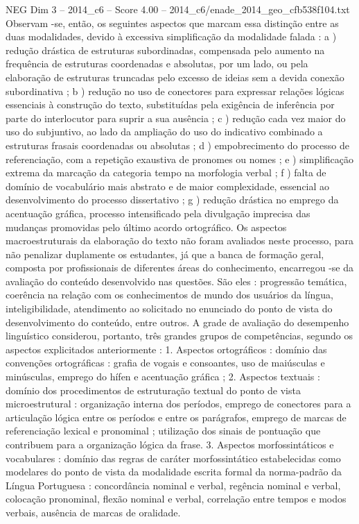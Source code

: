 \begin{textsample}{NEG Dim 3 – 2014\_c6 – Score 4.00 – 2014\_c6/enade\_2014\_geo\_cfb538f104.txt}
Observam -se, então, os seguintes aspectos que marcam essa distinção entre as duas modalidades, devido à excessiva simplificação da modalidade falada : a ) redução drástica de estruturas subordinadas, compensada pelo aumento na frequência de estruturas coordenadas e absolutas, por um lado, ou pela elaboração de estruturas truncadas pelo excesso de ideias sem a devida conexão subordinativa ; b ) redução no uso de conectores para expressar relações lógicas essenciais à construção do texto, substituídas pela exigência de inferência por parte do interlocutor para suprir a sua ausência ; c ) redução cada vez maior do uso do subjuntivo, ao lado da ampliação do uso do indicativo combinado a estruturas frasais coordenadas ou absolutas ; d ) empobrecimento do processo de referenciação, com a repetição exaustiva de pronomes ou nomes ; e ) simplificação extrema da marcação da categoria tempo na morfologia verbal ; f ) falta de domínio de vocabulário mais abstrato e de maior complexidade, essencial ao desenvolvimento do processo dissertativo ; g ) redução drástica no emprego da acentuação gráfica, processo intensificado pela divulgação imprecisa das mudanças promovidas pelo último acordo ortográfico.
Os aspectos macroestruturais da elaboração do texto não foram avaliados neste processo, para não penalizar duplamente os estudantes, já que a banca de formação geral, composta por profissionais de diferentes áreas do conhecimento, encarregou -se da avaliação do conteúdo desenvolvido nas questões.
São eles : progressão temática, coerência na relação com os conhecimentos de mundo dos usuários da língua, inteligibilidade, atendimento ao solicitado no enunciado do ponto de vista do desenvolvimento do conteúdo, entre outros.
A grade de avaliação do desempenho linguístico considerou, portanto, três grandes grupos de competências, segundo os aspectos explicitados anteriormente : 1.
Aspectos ortográficos : domínio das convenções ortográficas : grafia de vogais e consoantes, uso de maiúsculas e minúsculas, emprego do hífen e acentuação gráfica ; 2.
Aspectos textuais : domínio dos procedimentos de estruturação textual do ponto de vista microestrutural : organização interna dos períodos, emprego de conectores para a articulação lógica entre os períodos e entre os parágrafos, emprego de marcas de referenciação lexical e pronominal ; utilização dos sinais de pontuação que contribuem para a organização lógica da frase. 3.
Aspectos morfossintáticos e vocabulares : domínio das regras de caráter morfossintático estabelecidas como modelares do ponto de vista da modalidade escrita formal da norma-padrão da Língua Portuguesa : concordância nominal e verbal, regência nominal e verbal, colocação pronominal, flexão nominal e verbal, correlação entre tempos e modos verbais, ausência de marcas de oralidade.

\end{textsample}
